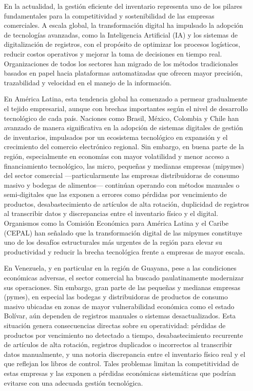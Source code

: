 \documentclass[12pt, letterpaper]{report}
\begin{document}
En la actualidad, la gestión eficiente del inventario representa uno de
los pilares fundamentales para la competitividad y sostenibilidad de las
empresas comerciales. A escala global, la transformación digital ha
impulsado la adopción de tecnologías avanzadas, como la Inteligencia
Artificial (IA) y los sistemas de digitalización de registros, con el
propósito de optimizar los procesos logísticos, reducir costos
operativos y mejorar la toma de decisiones en tiempo real. Organizaciones
de todos los sectores han migrado de los métodos tradicionales basados en
papel hacia plataformas automatizadas que ofrecen mayor precisión,
trazabilidad y velocidad en el manejo de la información.

En América Latina, esta tendencia global ha comenzado a permear
gradualmente el tejido empresarial, aunque con brechas importantes según
el nivel de desarrollo tecnológico de cada país. Naciones como Brasil,
México, Colombia y Chile han avanzado de manera significativa en la
adopción de sistemas digitales de gestión de inventarios, impulsados por
un ecosistema tecnológico en expansión y el crecimiento del comercio
electrónico regional. Sin embargo, en buena parte de la región,
especialmente en economías con mayor volatilidad y menor acceso a
financiamiento tecnológico, las micro, pequeñas y medianas empresas
(mipymes) del sector comercial ---particularmente las empresas
distribuidoras de consumo masivo y bodegas de alimentos--- continúan
operando con métodos manuales o semi-digitales que las exponen a errores
como pérdidas por vencimiento de productos, desabastecimiento de
artículos de alta rotación, duplicidad de registros al transcribir datos
y discrepancias entre el inventario físico y el digital. Organismos como
la Comisión Económica para América Latina y el Caribe (CEPAL) han
señalado que la transformación digital de las mipymes constituye uno de
los desafíos estructurales más urgentes de la región para elevar su
productividad y reducir la brecha tecnológica frente a empresas de mayor
escala.

En Venezuela, y en particular en la región de Guayana, pese a las
condiciones económicas adversas, el sector comercial ha buscado
paulatinamente modernizar sus operaciones. Sin embargo, gran parte de
las pequeñas y medianas empresas (pymes), en especial las bodegas y
distribuidoras de productos de consumo masivo ubicadas en zonas de mayor
vulnerabilidad económica como el estado Bolívar, aún dependen de
registros manuales o sistemas desactualizados. Esta situación genera
consecuencias directas sobre su operatividad: pérdidas de productos por
vencimiento no detectado a tiempo, desabastecimiento recurrente de
artículos de alta rotación, registros duplicados o incorrectos al
transcribir datos manualmente, y una notoria discrepancia entre el
inventario físico real y el que reflejan los libros de control. Tales
problemas limitan la competitividad de estas empresas y las exponen a
pérdidas económicas sistemáticas que podrían evitarse con una adecuada
gestión tecnológica.
\end{document}
